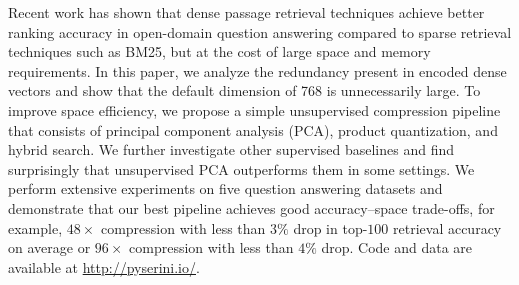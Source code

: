 Recent work has shown that dense passage retrieval techniques achieve better ranking accuracy in open-domain question answering compared to sparse retrieval techniques such as BM25, but at the cost of large space and memory requirements. In this paper, we analyze the redundancy present in encoded dense vectors and show that the default dimension of 768 is unnecessarily large. To improve space efficiency, we propose a simple unsupervised compression pipeline that consists of principal component analysis (PCA), product quantization, and hybrid search. We further investigate other supervised baselines and find surprisingly that unsupervised PCA outperforms them in some settings. We perform extensive experiments on five question answering datasets and demonstrate that our best pipeline achieves good accuracy--space trade-offs, for example, $48\times$ compression with less than $3\%$ drop in top-$100$ retrieval accuracy on average or $96\times$ compression with less than $4\%$ drop. Code and data are available at \url{http://pyserini.io/}.
